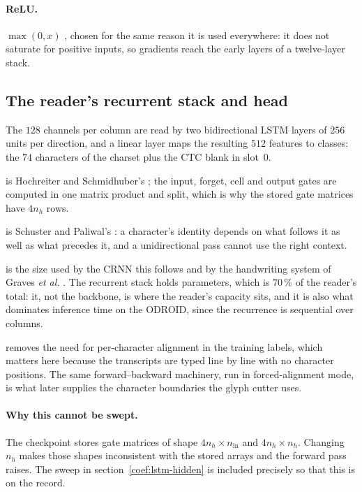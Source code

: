 \documentclass[11pt,a4paper]{article}
\begin{document}
\paragraph{ReLU.} $\max(0,x)$ \cite[p.~807]{nair2010}, chosen for the same
reason it is used everywhere: it does not saturate for positive inputs, so
gradients reach the early layers of a twelve-layer stack.

\subsection{The reader's recurrent stack and head}

The $128$ channels per column are read by two bidirectional LSTM layers of
$256$ units per direction, and a linear layer maps the resulting $512$ features
to \ArchClasses{} classes: the $74$ characters of the charset plus the CTC
blank in slot~0.

\begin{description}[leftmargin=2em]
\item[The LSTM cell] is Hochreiter and Schmidhuber's \cite{hochreiter1997};
the input, forget, cell and output gates are computed in one matrix product and
split, which is why the stored gate matrices have $4n_h$ rows.
\item[Reading both directions] is Schuster and Paliwal's \cite{schuster1997}:
a character's identity depends on what follows it as well as what precedes it,
and a unidirectional pass cannot use the right context.
\item[Two layers of 256] is the size used by the CRNN this follows
\cite[p.~2298]{shi2017} and by the handwriting system of Graves \textit{et al.}
\cite[p.~855]{graves2009}. The recurrent stack holds \ArchLstmParams{}
parameters, which is $70\,\%$ of the reader's \ArchReaderTotal{} total: it, not
the backbone, is where the reader's capacity sits, and it is also what dominates
inference time on the ODROID, since the recurrence is sequential over
\ArchFrames{} columns.
\item[CTC] \cite[pp.~370--372]{graves2006} removes the need for per-character
alignment in the training labels, which matters here because the transcripts are
typed line by line with no character positions. The same forward--backward
machinery, run in forced-alignment mode, is what later supplies the character
boundaries the glyph cutter uses.
\end{description}

\paragraph{Why this cannot be swept.} The checkpoint stores gate matrices of
shape $4n_h \times n_{\text{in}}$ and $4n_h \times n_h$. Changing $n_h$ makes
those shapes inconsistent with the stored arrays and the forward pass raises.
The sweep in section~\ref{coef:lstm-hidden} is included precisely so that this
is on the record.
\end{document}
